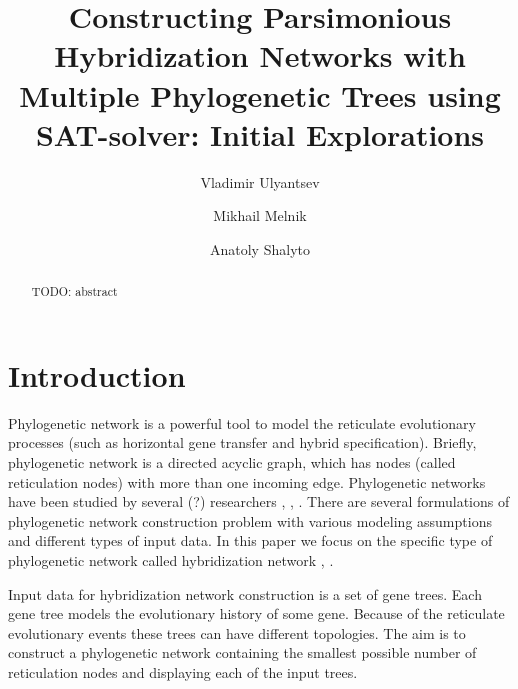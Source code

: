\documentclass[runningheads, envcountsame, a4paper]{llncs}
\begin{document}
\mainmatter           
\title{Constructing Parsimonious Hybridization Networks with Multiple Phylogenetic Trees using SAT-solver: Initial Explorations}
\titlerunning{ } 
\toctitle{ }

\author{Vladimir Ulyantsev \and Mikhail Melnik \and Anatoly Shalyto}
%

\maketitle
\setcounter{footnote}{0}

\begin{abstract}
  TODO: abstract

\end{abstract}

\section{Introduction}

Phylogenetic network is a powerful tool to model the reticulate
evolutionary processes (such as horizontal gene transfer and hybrid specification).
Briefly, phylogenetic network is a directed acyclic graph, which has
nodes (called reticulation nodes) with more than one incoming edge. Phylogenetic
networks have been studied by several (?) researchers \cite{huson2010phylogenetic}, \cite{morrison2011introduction}, 
\cite{nakhleh2011evolutionary}. There are several formulations of phylogenetic network
construction problem with various modeling assumptions and different types of input data. 
In this paper we focus on the specific type of phylogenetic network called hybridization
network \cite{semple2006hybridization}, \cite{chen2010hybridnet}.

Input data for hybridization network construction is a set of gene trees. %
Each gene tree models the evolutionary history of some gene. %
Because of the reticulate evolutionary events these trees can have different topologies.
The aim is to construct a phylogenetic network
containing the smallest possible number of reticulation nodes and displaying each of the input trees. 
\end{document}
